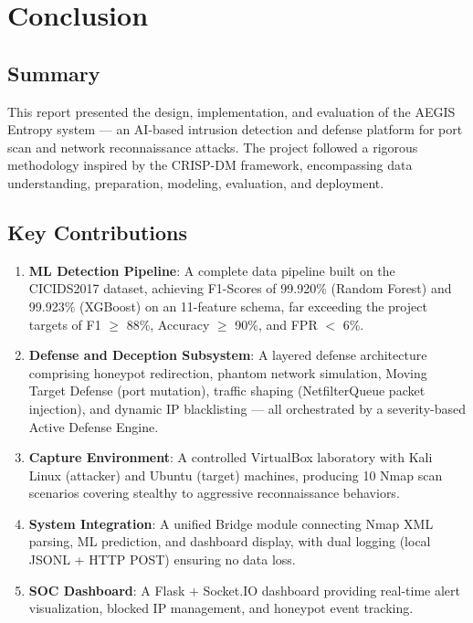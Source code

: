 
\chapter{Conclusion}

\section{Summary}

This report presented the design, implementation, and evaluation of the AEGIS Entropy system --- an AI-based intrusion detection and defense platform for port scan and network reconnaissance attacks. The project followed a rigorous methodology inspired by the CRISP-DM framework, encompassing data understanding, preparation, modeling, evaluation, and deployment.

\section{Key Contributions}

\begin{enumerate}
    \item \textbf{ML Detection Pipeline}: A complete data pipeline built on the CICIDS2017 dataset, achieving F1-Scores of 99.920\% (Random Forest) and 99.923\% (XGBoost) on an 11-feature schema, far exceeding the project targets of F1 $\geq$ 88\%, Accuracy $\geq$ 90\%, and FPR $<$ 6\%.

    \item \textbf{Defense and Deception Subsystem}: A layered defense architecture comprising honeypot redirection, phantom network simulation, Moving Target Defense (port mutation), traffic shaping (NetfilterQueue packet injection), and dynamic IP blacklisting --- all orchestrated by a severity-based Active Defense Engine.

    \item \textbf{Capture Environment}: A controlled VirtualBox laboratory with Kali Linux (attacker) and Ubuntu (target) machines, producing 10 Nmap scan scenarios covering stealthy to aggressive reconnaissance behaviors.

    \item \textbf{System Integration}: A unified Bridge module connecting Nmap XML parsing, ML prediction, and dashboard display, with dual logging (local JSONL + HTTP POST) ensuring no data loss.

    \item \textbf{SOC Dashboard}: A Flask + Socket.IO dashboard providing real-time alert visualization, blocked IP management, and honeypot event tracking.
\end{enumerate}

